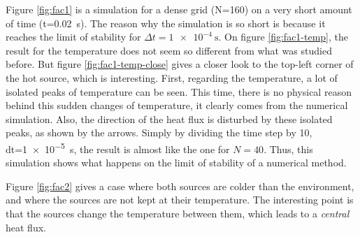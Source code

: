 \documentclass[a4paper,12pt,twoside]{article}
\begin{document}
Figure \ref{fig:fac1} is a simulation for a dense grid (N=160) on a very short amount of time (t=\SI{0.02}{\s}).
The reason why the simulation is so short is because it reaches the limit of stability for $\Delta t=\SI{1e-4}{\s}$.
On figure \ref{fig:fac1-temp}, the result for the temperature does not seem so different from what was studied before.
But figure \ref{fig:fac1-temp-close} gives a closer look to the top-left corner of the hot source, which is interesting.
First, regarding the temperature, a lot of isolated peaks of temperature can be seen.
This time, there is no physical reason behind this sudden changes of temperature, it clearly comes from the numerical simulation.
Also, the direction of the heat flux is disturbed by these isolated peaks, as shown by the arrows.
Simply by dividing the time step by \num{10}, dt=\SI{1e-5}{\s}, the result is almost like the one for $N=40$.
Thus, this simulation shows what happens on the limit of stability of a numerical method.

Figure \ref{fig:fac2} gives a case where both sources are colder than the environment, and where the sources are not kept at their temperature.
The interesting point is that the sources change the temperature between them, which leads to a \textit{central} heat flux.
\end{document}
